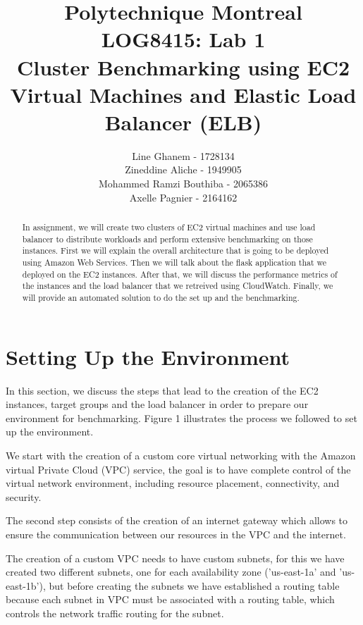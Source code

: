 \documentclass[12pt]{article}
\title{Polytechnique Montreal \\
LOG8415: Lab 1\\
Cluster Benchmarking using EC2 Virtual
Machines and Elastic Load Balancer (ELB)}
\author{Line Ghanem - 1728134\\Zineddine Aliche - 1949905\\
Mohammed Ramzi Bouthiba - 2065386\\Axelle Pagnier - 2164162}
\begin{document}
\maketitle

\begin{abstract}
In	assignment,	we	will	create	two	clusters of	EC2 virtual	machines and use	load	balancer	to	distribute	workloads	and	perform	extensive	benchmarking	on	those instances.\newline
First we will explain the overall architecture that is going to be deployed using Amazon Web Services. Then we will talk about the flask application that we deployed on the EC2 instances. After that, we will discuss the performance metrics of the instances and the load balancer that we retreived using CloudWatch.	Finally, we will provide an automated solution to do the set up and the benchmarking.
\end{abstract}

\section{Setting Up the Environment}

In this section, we discuss the steps that lead to the creation of the EC2 instances, target groups and the load balancer in order to prepare our environment for benchmarking. Figure 1 illustrates the process we followed to set up the environment.\vspace{1em}

We start with the creation of a custom core virtual networking with the Amazon virtual Private Cloud (VPC) service, the goal is to have complete control of the virtual network environment, including resource placement, connectivity, and security.\vspace{1em}

The second step consists of the creation of an internet gateway which allows to ensure the communication between our resources in the VPC and the internet.\vspace{1em}

The creation of a custom VPC needs to have custom subnets, for this we have created two different subnets, one for each availability zone ('us-east-1a' and 'us-east-1b'), but before creating the subnets we have established a routing table because each subnet in VPC must be associated with a routing table, which controls the network traffic routing for the subnet.\vspace{1em}
\end{document}

